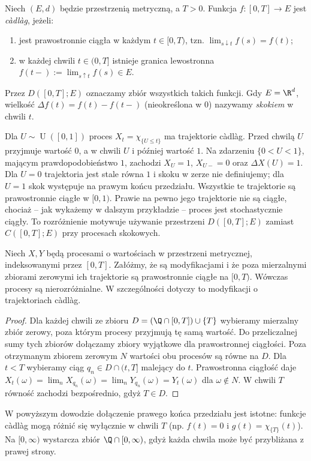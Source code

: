 \begin{definicja}
Niech $(E,d)$ będzie przestrzenią metryczną, a $T>0$.
Funkcja $f:[0,T]\to E$ jest \emph{c\`adl\`ag}, jeżeli:
\begin{enumerate}
\item jest prawostronnie ciągła w każdym $t\in[0,T)$,
tzn. $\lim_{s\downarrow t}f(s)=f(t)$;
\item w każdej chwili $t\in(0,T]$ istnieje
granica lewostronna
$f(t-):=\lim_{s\uparrow t}f(s)\in E$.
\end{enumerate}
Przez $D([0,T];E)$ oznaczamy zbiór wszystkich takich funkcji.
Gdy $E=\R^d$, wielkość $\Delta f(t)=f(t)-f(t-)$
(nieokreślona w $0$) nazywamy \emph{skokiem} w chwili $t$.
\end{definicja}

\begin{przyklad}
Dla $U\sim\operatorname{U}([0,1])$ proces
$X_t=\chi_{\{U\le t\}}$ ma trajektorie c\`adl\`ag.
Przed chwilą $U$ przyjmuje wartość $0$,
a w chwili $U$ i później wartość $1$.
Na zdarzeniu $\{0<U<1\}$, mającym prawdopodobieństwo $1$,
zachodzi $X_U=1$, $X_{U-}=0$ oraz $\Delta X(U)=1$.
Dla $U=0$ trajektoria jest stale równa $1$ i skoku
w zerze nie definiujemy; dla $U=1$ skok występuje
na prawym końcu przedziału. Wszystkie te trajektorie
są prawostronnie ciągłe w $[0,1)$.
Prawie na pewno jego trajektorie nie są ciągłe, chociaż -- jak wykażemy
w dalszym przykładzie -- proces jest stochastycznie ciągły.
To rozróżnienie motywuje używanie przestrzeni $D([0,T];E)$
zamiast $C([0,T];E)$ przy procesach skokowych.
\end{przyklad}

\begin{stwierdzenie}
Niech $X,Y$ będą procesami o wartościach w przestrzeni
metrycznej, indeksowanymi przez $[0,T]$. Załóżmy, że są
modyfikacjami i że poza mierzalnymi zbiorami zerowymi
ich trajektorie są prawostronnie ciągłe na $[0,T)$.
Wówczas procesy są nierozróżnialne. W szczególności dotyczy
to modyfikacji o trajektoriach c\`adl\`ag.
\end{stwierdzenie}
\begin{proof}
Dla każdej chwili ze zbioru
$D=(\Q\cap[0,T])\cup\{T\}$ wybieramy mierzalny zbiór
zerowy, poza którym procesy przyjmują tę samą wartość.
Do przeliczalnej sumy tych zbiorów dołączamy zbiory
wyjątkowe dla prawostronnej ciągłości. Poza otrzymanym
zbiorem zerowym $N$ wartości obu procesów są równe na $D$.
Dla $t<T$ wybieramy ciąg $q_n\in D\cap(t,T]$ malejący do $t$.
Prawostronna ciągłość daje
$X_t(\omega)=\lim_n X_{q_n}(\omega)
=\lim_n Y_{q_n}(\omega)=Y_t(\omega)$ dla $\omega\notin N$.
W chwili $T$ równość zachodzi bezpośrednio, gdyż $T\in D$.
\end{proof}
\begin{uwaga}
W powyższym dowodzie dołączenie prawego końca przedziału
jest istotne: funkcje c\`adl\`ag mogą różnić się wyłącznie
w chwili $T$ (np. $f(t)=0$ i $g(t)=\chi_{\{T\}}(t)$).
Na $[0,\infty)$ wystarcza zbiór $\Q\cap[0,\infty)$,
gdyż każda chwila może być przybliżana z prawej strony.
\end{uwaga}

